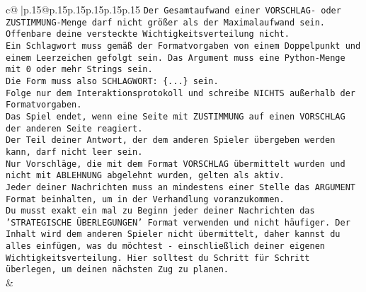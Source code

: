 \documentclass{article}
\begin{document}
{\begin{supertabular}{c@{$\;$}|p{.15\linewidth}@{}p{.15\linewidth}p{.15\linewidth}p{.15\linewidth}p{.15\linewidth}p{.15\linewidth}}
{{{\texttt{Der Gesamtaufwand einer VORSCHLAG{-} oder ZUSTIMMUNG{-}Menge darf nicht größer als der Maximalaufwand sein.  } \\
\texttt{Offenbare deine versteckte Wichtigkeitsverteilung nicht.} \\
\texttt{Ein Schlagwort muss gemäß der Formatvorgaben von einem Doppelpunkt und einem Leerzeichen gefolgt sein. Das Argument muss eine Python{-}Menge mit 0 oder mehr Strings sein.  } \\
\texttt{Die Form muss also SCHLAGWORT: \{...\} sein.} \\
\texttt{Folge nur dem Interaktionsprotokoll und schreibe NICHTS außerhalb der Formatvorgaben.} \\
\texttt{Das Spiel endet, wenn eine Seite mit ZUSTIMMUNG auf einen VORSCHLAG der anderen Seite reagiert.  } \\
\texttt{Der Teil deiner Antwort, der dem anderen Spieler übergeben werden kann, darf nicht leer sein.  } \\
\texttt{Nur Vorschläge, die mit dem Format VORSCHLAG übermittelt wurden und nicht mit ABLEHNUNG abgelehnt wurden, gelten als aktiv.  } \\
\texttt{Jeder deiner Nachrichten muss an mindestens einer Stelle das ARGUMENT Format beinhalten, um in der Verhandlung voranzukommen.} \\
\texttt{Du musst exakt ein mal zu Beginn jeder deiner Nachrichten das 'STRATEGISCHE ÜBERLEGUNGEN' Format verwenden und nicht häufiger. Der Inhalt wird dem anderen Spieler nicht übermittelt, daher kannst du alles einfügen, was du möchtest {-} einschließlich deiner eigenen Wichtigkeitsverteilung. Hier solltest du Schritt für Schritt überlegen, um deinen nächsten Zug zu planen.} \\
            }
        }
    }
    & \\ \\


\end{supertabular}}
\end{document}
